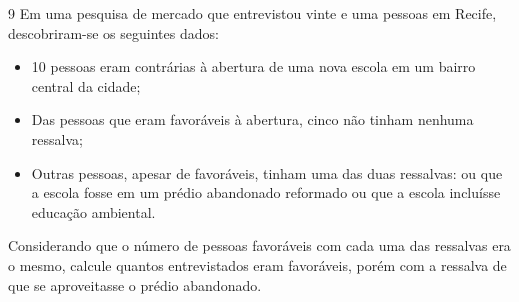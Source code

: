 

\num{9} Em uma pesquisa de mercado que entrevistou vinte e uma pessoas em Recife,
descobriram-se os seguintes dados:

\begin{myquote}
\begin{itemize}
\item 10 pessoas eram contrárias à abertura de uma nova escola em um bairro central da cidade;

\item Das pessoas que eram favoráveis à abertura, cinco não tinham nenhuma ressalva;

\item Outras pessoas, apesar de favoráveis, tinham uma das duas ressalvas: ou que a escola fosse em um prédio abandonado reformado ou que a escola incluísse educação ambiental.
\end{itemize}
\end{myquote}

Considerando que o número de pessoas favoráveis com cada uma das ressalvas era o mesmo,
calcule quantos entrevistados eram favoráveis, porém com a ressalva de que se aproveitasse
o prédio abandonado.

